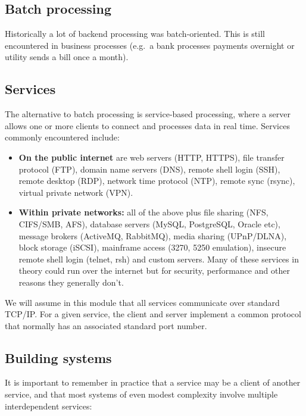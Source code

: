 \subsection{Batch processing}
\label{sec:batch-processing}

Historically a lot of backend processing was batch-oriented. This is
still encountered in business processes (e.g.~a bank processes payments
overnight or utility sends a bill once a month).

\subsection{Services}
\label{sec:services}

The alternative to batch processing is service-based processing, where a
server allows one or more clients to connect and processes data in real
time. Services commonly encountered include:

\begin{itemize}
\item
  \textbf{On the public internet} are web servers (HTTP, HTTPS), file
  transfer protocol (FTP), domain name servers (DNS), remote shell login
  (SSH), remote desktop (RDP), network time protocol (NTP), remote sync
  (rsync), virtual private network (VPN).
\item
  \textbf{Within private networks:} all of the above plus file sharing
  (NFS, CIFS/SMB, AFS), database servers (MySQL, PostgreSQL, Oracle
  etc), message brokers (ActiveMQ, RabbitMQ), media sharing (UPnP/DLNA),
  block storage (iSCSI), mainframe access (3270, 5250 emulation),
  insecure remote shell login (telnet, rsh) and custom servers. Many of
  these services in theory could run over the internet but for security,
  performance and other reasons they generally don't.
\end{itemize}

We will assume in this module that all services communicate over
standard TCP/IP. For a given service, the client and server implement a
common protocol that normally has an associated standard port number.

\subsection{Building systems}
\label{sec:building-systems}

It is important to remember in practice that a service may be a client
of another service, and that most systems of even modest complexity
involve multiple interdependent services:


